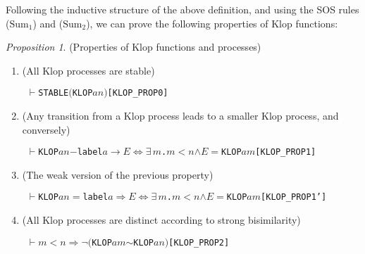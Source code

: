 \documentclass[GCNS]{yincog}
\renewcommand{\HOLConst}[1]{\texttt{#1}}
\renewcommand{\HOLBoundVar}[1]{\ensuremath{\mathit{#1}}}
\renewcommand{\HOLFreeVar}[1]{\ensuremath{\mathit{#1}}}
\renewcommand{\HOLSymConst}[1]{#1}
\renewcommand{\HOLTokenConj}{\ensuremath{\wedge}}
\renewcommand{\HOLTokenLt}{\ensuremath{<}}
\renewcommand{\HOLTokenNeg}{\ensuremath{\neg}}
\renewcommand{\HOLTokenEquiv}{\ensuremath{\Longleftrightarrow}}
\renewcommand{\HOLTokenExists}{\ensuremath{\exists \,}}
\renewcommand{\HOLTokenTurnstile}{\ensuremath{\:\:\vdash}}
\theoremstyle{remark}
\theoremstyle{theorem}
\newtheorem{proposition}[definition]{Proposition}
\theoremstyle{remark}
\newcommand{\HOLTokenStrongEQ}{$\sim$}
\newcommand{\HOLTokenTransBegin}{$-$}
\newcommand{\HOLTokenTransEnd}{$\rightarrow$\xspace}
\newcommand{\HOLTokenWeakTransBegin}{$=$}
\newcommand{\HOLTokenWeakTransEnd}{$\Rightarrow$\xspace}
\renewcommand{\HOLTokenImp}{\ensuremath{\Longrightarrow}}
\begin{document}
Following the inductive structure of the above definition, and using the
SOS rules ($\mathrm{Sum}_1$) and ($\mathrm{Sum}_2$), we can prove the following
properties of Klop functions:
%
\begin{proposition}%
{(Properties of Klop functions and processes)}
%
\begin{enumerate}
%
\item (All Klop processes are stable)
%
\begin{alltt}
\HOLTokenTurnstile{} \HOLConst{STABLE} \ensuremath{(}\HOLConst{KLOP} \HOLFreeVar{a} \HOLFreeVar{n}\ensuremath{)}\hfill[KLOP\_PROP0]
\end{alltt}

%
\item (Any transition from a Klop process leads to a smaller Klop process,
and conversely)
%
\begin{alltt}
\HOLTokenTurnstile{} \HOLConst{KLOP} \HOLFreeVar{a} \HOLFreeVar{n} \HOLTokenTransBegin\HOLConst{label} \HOLFreeVar{a}\HOLTokenTransEnd \HOLFreeVar{E} \HOLSymConst{\HOLTokenEquiv{}} \HOLSymConst{\HOLTokenExists{}}\HOLBoundVar{m}. \HOLBoundVar{m} \HOLSymConst{\HOLTokenLt{}} \HOLFreeVar{n} \HOLSymConst{\HOLTokenConj{}} \HOLFreeVar{E} \HOLSymConst{\ensuremath{=}} \HOLConst{KLOP} \HOLFreeVar{a} \HOLBoundVar{m}\hfill{[KLOP\_PROP1]}
\end{alltt}
%
\item (The weak version of the previous property)
%
\begin{alltt}
\HOLTokenTurnstile{} \HOLConst{KLOP} \HOLFreeVar{a} \HOLFreeVar{n} \HOLTokenWeakTransBegin\HOLConst{label} \HOLFreeVar{a}\HOLTokenWeakTransEnd \HOLFreeVar{E} \HOLSymConst{\HOLTokenEquiv{}} \HOLSymConst{\HOLTokenExists{}}\HOLBoundVar{m}. \HOLBoundVar{m} \HOLSymConst{\HOLTokenLt{}} \HOLFreeVar{n} \HOLSymConst{\HOLTokenConj{}} \HOLFreeVar{E} \HOLSymConst{\ensuremath{=}} \HOLConst{KLOP} \HOLFreeVar{a} \HOLBoundVar{m}\hfill{[KLOP\_PROP1']}
\end{alltt}
%
\item (All Klop processes are distinct according to strong bisimilarity)
%
\begin{alltt}
\HOLTokenTurnstile{} \HOLFreeVar{m} \HOLSymConst{\HOLTokenLt{}} \HOLFreeVar{n} \HOLSymConst{\HOLTokenImp{}} \HOLSymConst{\HOLTokenNeg{}}\ensuremath{(}\HOLConst{KLOP} \HOLFreeVar{a} \HOLFreeVar{m} \HOLSymConst{\HOLTokenStrongEQ} \HOLConst{KLOP} \HOLFreeVar{a} \HOLFreeVar{n}\ensuremath{)}\hfill{[KLOP\_PROP2]}
\end{alltt}
%

\end{enumerate}
\end{proposition}
\end{document}
